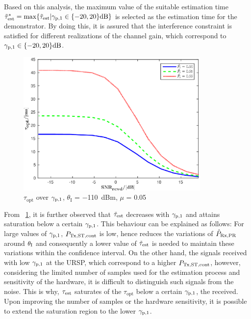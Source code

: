 Based on this analysis, the maximum value of the suitable estimation time $\tilde{\tau}^*_{\text{est}} = \operatorname*{max}\{ \tilde{\tau}_{\text{est}} | {\gamma}_{\text{p,1}} \in \{-20,20 \}\SI{}{dB} \}$ is selected as the estimation time for the demonstrator.  
By doing this, it is assured that the interference constraint is satisfied for different realizations of the channel gain, which correspond to ${\gamma}_{\text{p,1}} \in \{-20,20\}\SI{}{dB}$. 
\begin{figure}
	\centering
	\includegraphics[width=0.85\textwidth]{figures/tau_snr}
	\caption{$\tau_\textrm{opt}$ over ${\gamma}_{\text{p,1}}$, $\theta_\textrm{I}$ = \SI{-110}{dBm}, $\mu$ = 0.05}
	\label{fig:Tausnr}
\end{figure}
From \figurename~\ref{fig:Tausnr}, it is further observed that $\tilde{\tau}_{\text{est}}$ decreases with ${\gamma}_{\text{p,1}}$ and attains saturation below a certain ${\gamma}_{\text{p,1}}$. %
This behaviour can be explained as follows: For large values of ${\gamma}_{\text{p,1}}$, $P_{\text{Tx,ST,cont}}$ is low, hence reduces the variations of $\hat{P}_{\text{Rx,PR}}$ around $\theta_{\text{I}}$ and consequently a lower value of $\tilde{\tau}_{\text{est}}$ is needed to maintain these variations within the confidence interval. On the other hand, the signals received with low ${\gamma}_{\text{p,1}}$ at the URSP, which correspond to a higher $P_{\text{Tx,ST,cont}}$, however, considering the limited number of samples used for the estimation process and sensitivity of the hardware, it is difficult to distinguish such signals from the noise. This is why, $\tau_{\text{est}}$ saturates of the $\tau_\textrm{opt}$ below a certain ${\gamma}_{\text{p,1}}$, the received. Upon improving the number of samples or the hardware sensitivity, it is possible to extend the saturation region to the lower ${\gamma}_{\text{p,1}}$. 

